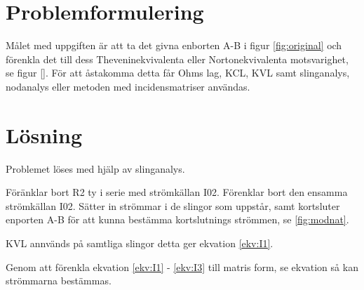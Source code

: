 \documentclass[a4paper,12pt]{article}
\begin{document}
\maketitle
\thispagestyle{empty}
\newpage

\section*{Problemformulering}
Målet med uppgiften är att ta det givna enborten A-B i figur \ref{fig:original} och förenkla det till dess Theveninekvivalenta eller Nortonekvivalenta motsvarighet, se figur \ref{}. För att åstakomma detta får Ohms lag, KCL, KVL samt slinganalys, nodanalys eller metoden med incidensmatriser användas.

\section*{Lösning}
Problemet löses med hjälp av slinganalys.


Föränklar bort R2 ty i serie med strömkällan I02. Förenklar bort den ensamma strömkällan I02. Sätter in strömmar i de slingor som uppstår, samt kortsluter enporten A-B för att kunna bestämma kortslutnings strömmen, se \ref{fig:modnat}.


KVL annvänds på samtliga slingor detta ger ekvation \ref{ekv:I1}.


Genom att förenkla ekvation \ref{ekv:I1} - \ref{ekv:I3} till matris form, se ekvation så kan strömmarna bestämmas.

\end{document}
